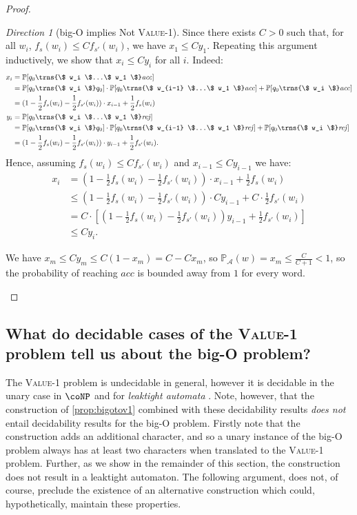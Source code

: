 \documentclass{lmcs}
\theoremstyle{plain}
\theoremstyle{definition}
\theoremstyle{remark}
\newtheorem{dir}{Direction}
\newcommand\acc{\mathit{acc}}
\newcommand\rej{\mathit{rej}}
\newcommand\pr{\mathbb{P}}
\newcommand\pa{\mathcal{A}}
\renewcommand\nu{f}
\begin{document}
\begin{proof}
\begin{dir}[big-O implies Not \textsc{Value-1}]
Since there exists $C > 0$ such that, for all $w_i$, $ \nu_s(w_i)\le C \nu_{s'}(w_i) $, we have $x_1 \le C y_1$. Repeating this argument inductively, we show that $x_i \le C y_i$ for all $i$. Indeed:
\begin{align*}
x_i &= \pr[q_0 \trns{\$ w_i \$...\$ w_1 \$} \acc]
\\ &=\pr[q_0 \trns{\$ w_i \$} q_0] \cdot \pr[q_0 \trns{\$ w_{i-1} \$...\$ w_1 \$} \acc] + \pr[q_0 \trns{\$ w_i \$} \acc]
\\ &=(1- \frac{1}{2}\nu_s(w_i) -\frac{1}{2}\nu_{s'}(w_i) ) \cdot x_{i-1} + \frac{1}{2}\nu_s(w_i) \\
y_i &= \pr[q_0 \trns{\$ w_i \$...\$ w_1 \$} \rej]
\\ &=\pr[q_0 \trns{\$ w_i \$} q_0] \cdot \pr[q_0 \trns{\$ w_{i-1} \$...\$ w_1 \$} \rej] + \pr[q_0 \trns{\$ w_i \$} \rej] \\
&=(1- \frac{1}{2}\nu_s(w_i) -\frac{1}{2}\nu_{s'}(w_i) ) \cdot y_{i-1} + \frac{1}{2}\nu_{s'}(w_i).
\end{align*}
Hence, assuming $\nu_s(w_i)\le C \nu_{s'}(w_i)$ and $x_{i-1} \le C y_{i-1}$ we have: \begin{align*}x_i &=(1- \frac{1}{2}\nu_s(w_i) -\frac{1}{2}\nu_{s'}(w_i) ) \cdot x_{i-1} + \frac{1}{2}\nu_s(w_i)\\&\le (1- \frac{1}{2}\nu_s(w_i) -\frac{1}{2}\nu_{s'}(w_i) ) \cdot Cy_{i-1} + C \cdot \frac{1}{2}\nu_{s'}(w_i) \\&= C \cdot [(1- \frac{1}{2}\nu_s(w_i) -\frac{1}{2}\nu_{s'}(w_i) )y_{i-1} + \frac{1}{2}\nu_{s'}(w_i)]\\&\le Cy_{i}.\end{align*}

We have $x_m \le C y_m \le C(1-x_m) = C - C x_m$, so
$\pr_\pa(w) = x_m \le \frac{C}{C+1} < 1$, so the probability of reaching $\acc$ is bounded away from $1$ for every word.\qedhere\end{dir}\end{proof}

\subsection{What do decidable cases of the \textsc{Value-1} problem tell us about the big-O problem?}
\label{sec:val1:decidability}

The \textsc{Value-1} problem is undecidable in general, however it is decidable in the unary case  in $\coNP$ \cite{chadha2014decidable} and for \textit{leaktight automata} \cite{oualhadj2015deciding}. Note, however, that the construction of \cref{prop:bigotov1} combined with these decidability results \textit{does not} entail decidability results for the big-O problem. Firstly note that the construction adds an additional character, and so a unary instance of the big-O problem always has at least two characters when translated to the \textsc{Value-1} problem. Further, as we show in the remainder of this section, the construction does not result in a leaktight automaton.
The following argument, does not, of course, preclude the existence of an alternative construction which could, hypothetically, maintain these properties.
\end{document}
